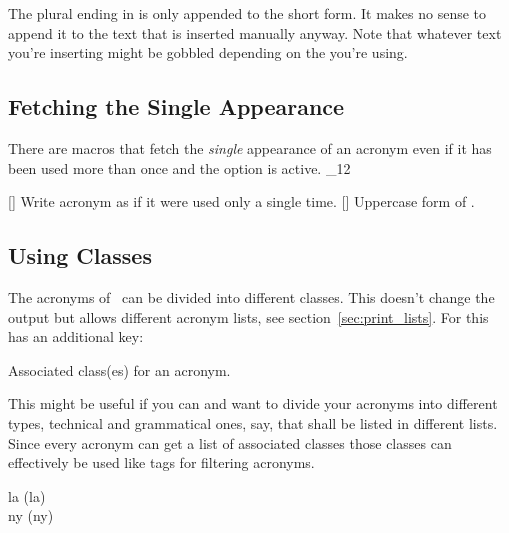 \documentclass[load-preamble+]{cnltx-doc}
\makeatletter
\renewenvironment{commands}
  {%
    \cnltx@set@catcode_{12}%
    \let\command\cnltx@command
    \cnltxlist
  }
  {\endcnltxlist}
\makeatother
\begin{document}
The plural ending in  is only appended to the short form.  It
makes no sense to append it to the text that is inserted manually anyway.
Note that whatever text you're inserting might be gobbled depending on the
 you're using.

\subsection{Fetching the Single Appearance}
There are macros that fetch the \emph{single} appearance of
an acronym even if it has been used more than once and the 
option is active.
\begin{commands}
  \command{acsingle}[\sarg{}]
    Write acronym as if it were used only a single time.
  \command{Acsingle}[\sarg{}]
    Uppercase form of .
\end{commands}

\begin{example}
\end{example}

\subsection{Using Classes}
The acronyms of \acro\ can be divided into different classes.  This doesn't
change the output but allows different acronym lists, see
section~\vref{sec:print_lists}.  For this  has an additional
key:
\begin{options}
    Associated class(es) for an acronym.
\end{options}

This might be useful if you can and want to divide your acronyms into
different types, technical and grammatical ones, say, that shall be listed in
different lists.  Since every acronym can get a list of associated classes
those classes can effectively be used like tags for filtering acronyms.

\begin{example}
  \acl{la} (\acs{la}) \\
  \acl{ny} (\acs{ny})
\end{example}
\end{document}

